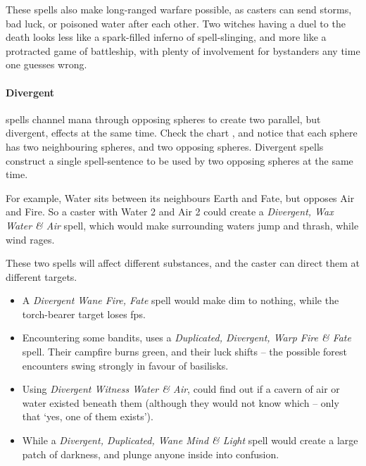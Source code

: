 \begin{multicols}{2}
\begin{exampletext}
  These spells also make long-ranged warfare possible, as casters can send storms, bad luck, or poisoned water after each other.
  Two witches having a duel to the death looks less like a spark-filled inferno of spell-slinging, and more like a protracted game of battleship, with plenty of involvement for bystanders any time one guesses wrong.
\end{exampletext}

\begin{figure*}[t!]
  \centering
  \speltogram
  \label{speltogram}
\end{figure*}

\paragraph{Divergent}
spells channel mana through opposing \glspl{sphere} to create two parallel, but divergent, effects at the same time.
Check the chart , and notice that each \gls{sphere} has two neighbouring \glspl{sphere}, and two opposing \glspl{sphere}.
Divergent spells construct a single spell-sentence to be used by two opposing \glspl{sphere} at the same time.

For example, Water sits between its neighbours Earth and Fate, but opposes Air and Fire.
So a caster with Water 2 and Air 2 could create a \textit{Divergent, Wax Water \& Air} spell, which would make surrounding waters jump and thrash, while wind rages.

These two spells will affect different substances, and the caster can direct them at different targets.

\begin{itemize}
  \item
  A \textit{Divergent Wane Fire, Fate} spell would make  dim to nothing, while the torch-bearer target loses \glspl{fp}.
  \item
  Encountering some bandits,  uses a \textit{Duplicated, Divergent, Warp Fire \& Fate} spell.
  Their campfire burns green, and their luck shifts -- the possible forest encounters swing strongly in favour of \glspl{basilisk}.
  \item
  Using \textit{Divergent Witness Water \& Air},  could find out if a cavern of air or water existed beneath them (although they would not know which -- only that `yes, one of them exists').
  \item
  While a \textit{Divergent, Duplicated, Wane Mind \& Light} spell would create a large patch of darkness, and plunge anyone inside into confusion.
\end{itemize}


\end{multicols}
